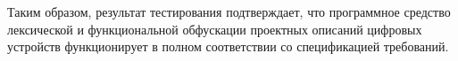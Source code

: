 Таким образом, результат тестирования подтверждает, что программное средство лексической и функциональной обфускации проектных описаний цифровых устройств функционирует в полном соответствии со спецификацией требований.

